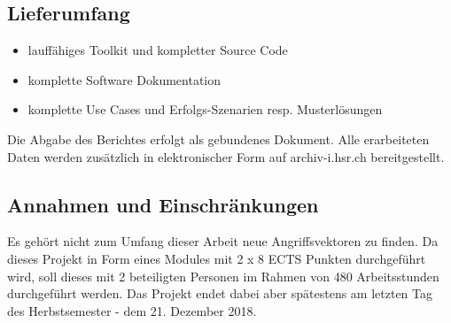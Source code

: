 \subsection{Lieferumfang}
\begin{itemize}
    \item lauffähiges Toolkit und kompletter Source Code
    \item komplette Software Dokumentation 
    \item komplette Use Cases und Erfolgs-Szenarien resp. Musterlösungen
\end{itemize}
Die Abgabe des Berichtes erfolgt als gebundenes Dokument. Alle erarbeiteten Daten werden zusätzlich in elektronischer Form auf archiv-i.hsr.ch bereitgestellt.

\subsection{Annahmen und Einschränkungen}
Es gehört nicht zum Umfang dieser Arbeit neue Angriffsvektoren zu finden. Da dieses Projekt in Form eines Modules mit 2 x 8 ECTS Punkten durchgeführt wird, soll dieses mit 2 beteiligten Personen im Rahmen von 480 Arbeitsstunden durchgeführt werden. Das Projekt endet dabei aber spätestens am letzten Tag des Herbstsemester - dem 21. Dezember 2018.